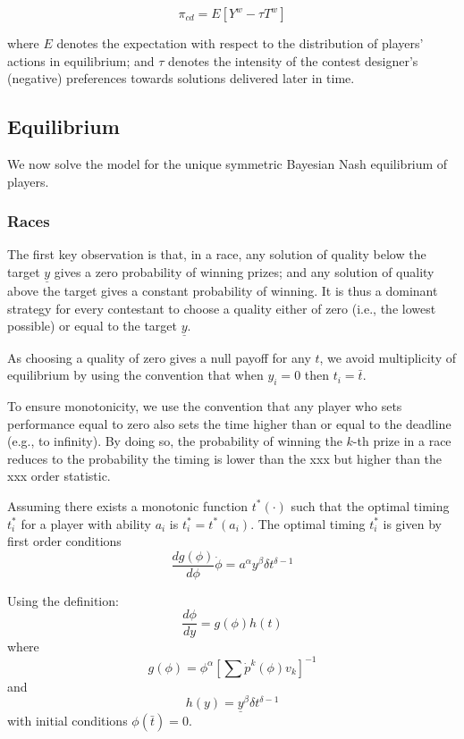 \documentclass[10pt, titlepage]{article}
\newcommand\deadline{\bar{t}}
\newcommand\target{\underline{y}}
\begin{document}
\[
    \pi_{cd} = E[Y^w - \tau T^w]
\]

where \(E\) denotes the expectation with respect to the distribution of
players' actions in equilibrium; and \(\tau\) denotes the intensity of
the contest designer's (negative) preferences towards solutions
delivered later in time.

\subsection{Equilibrium}\label{equilibrium}

We now solve the model for the unique symmetric Bayesian Nash
equilibrium of players.

\subsubsection{Races}\label{races}

The first key observation is that, in a race, any solution of quality
below the target \(\target\) gives a zero probability of winning prizes;
and any solution of quality above the target gives a constant
probability of winning. It is thus a dominant strategy for every
contestant to choose a quality either of zero (i.e., the lowest
possible) or equal to the target \(\target\).

As choosing a quality of zero gives a null payoff for any \(t\), we
avoid multiplicity of equilibrium by using the convention that when
\(y_i=0\) then \(t_i = \deadline\).

To ensure monotonicity, we use the convention that any player who sets
performance equal to zero also sets the time higher than or equal to the
deadline (e.g., to infinity). By doing so, the probability of winning
the \(k\)-th prize in a race reduces to the probability the timing is
lower than the xxx but higher than the xxx order statistic.

Assuming there exists a monotonic function \(t^*(\cdot)\) such that the
optimal timing \(t_i^*\) for a player with ability \(a_i\) is
\(t^*_i = t^*(a_i)\). The optimal timing \(t_i^*\) is given by first
order conditions \[
    \frac{d g(\phi)}{d \phi} \dot\phi = a^\alpha y^\beta \delta t^{\delta-1}
\]

Using the definition: \[
    \frac{d \phi}{d y} =  g(\phi) h(t)
\] where \[
    g(\phi) = \phi^\alpha \left[\sum \dot p^k (\phi) v_k \right]^{-1}
\] and \[
    h(y) =  \target^\beta  \delta t^{\delta -1}
\] with initial conditions \(\phi(\deadline)=0\).
\end{document}
